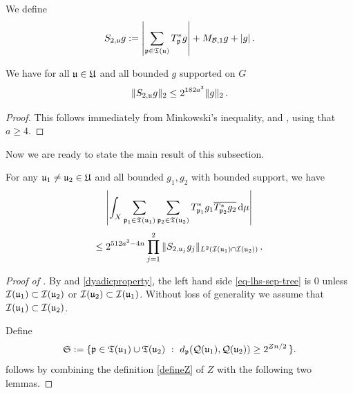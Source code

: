 We define
$$
    S_{2,{\mathfrak u}}g := \left|\sum_{{\mathfrak p} \in {\mathfrak T}({\mathfrak u})} T_{{\mathfrak p}}^*g \right| + M_{\mathcal{B},1}g + |g|\,.
$$
\begin{lemma}
    \label{adjoint-tree-control}
    \leanok
    We have for all ${\mathfrak u} \in {\mathfrak U}$ and all bounded $g$ supported on $G$
    $$
        \|S_{2, {\mathfrak u}} g\|_2 \le 2^{182a^3} \|g\|_2\,.
    $$
\end{lemma}

\begin{proof}
    \leanok
    This follows immediately from Minkowski's inequality,  and , using that $a \ge 4$.
\end{proof}


Now we are ready to state the main result of this subsection.

\begin{lemma}
    \label{correlation-separated-trees}
    \leanok
    For any ${\mathfrak u}_1 \ne {\mathfrak u}_2 \in {\mathfrak U}$ and all bounded $g_1, g_2$ with bounded support, we have
    \begin{equation}
        \label{eq-lhs-sep-tree}
        \left| \int_X \sum_{{\mathfrak p}_1 \in {\mathfrak T}({\mathfrak u}_1)} \sum_{{\mathfrak p}_2 \in {\mathfrak T}({\mathfrak u}_2)} T^*_{{\mathfrak p}_1}g_1 \overline{T^*_{{\mathfrak p}_2}g_2 }\,\mathrm{d}\mu \right|
    \end{equation}
    \begin{equation}
        \label{eq-rhs-sep-tree}
        \le 2^{512a^3-4n} \prod_{j =1}^2 \| S_{2, {\mathfrak u}_j} g_j\|_{L^2({\mathcal{I}}({\mathfrak u}_1) \cap {\mathcal{I}}({\mathfrak u}_2))}\,.
    \end{equation}
\end{lemma}

\begin{proof}[Proof of ]
    \leanok
    By  and \eqref{dyadicproperty}, the left hand side \eqref{eq-lhs-sep-tree} is $0$ unless ${\mathcal{I}}({\mathfrak u}_1) \subset {\mathcal{I}}({\mathfrak u}_2)$ or ${\mathcal{I}}({\mathfrak u}_2) \subset {\mathcal{I}}({\mathfrak u}_1)$. Without loss of generality we assume that ${\mathcal{I}}({\mathfrak u}_1) \subset {\mathcal{I}}({\mathfrak u}_2)$.

    Define
    \begin{equation}
        \label{def-Tree-S-set}
         \mathfrak{S} := \{\fp \in \fT(\fu_1) \cup \fT(\fu_2) \ : \ d_{\fp}(\fcc(\fu_1), \fcc(\fu_2)) \ge 2^{Zn/2}\,\}.
    \end{equation}
     follows by combining the definition \eqref{defineZ} of $Z$ with the following two lemmas.
\end{proof}

